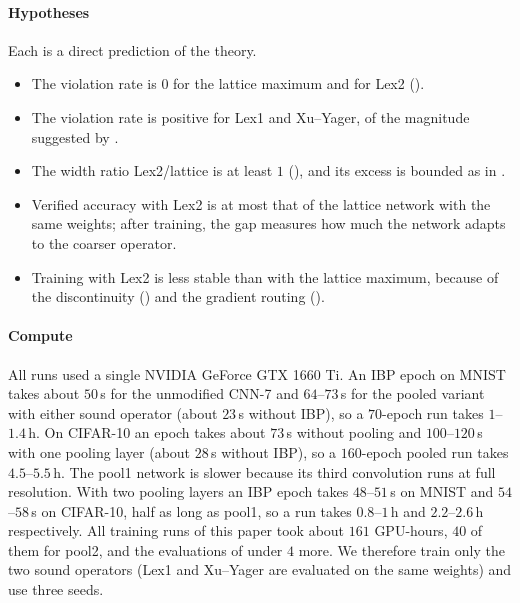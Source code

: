 \documentclass[preprint,12pt]{elsarticle}
\theoremstyle{definition}
\begin{document}
\paragraph{Hypotheses} Each is a direct prediction of the theory.
\begin{itemize}
\item[\textbf{H1}] The violation rate is $0$ for the lattice maximum and for Lex2 ().
\item[\textbf{H2}] The violation rate is positive for Lex1 and Xu--Yager, of the magnitude suggested by .
\item[\textbf{H3}] The width ratio Lex2/lattice is at least $1$ (), and its excess is bounded as in .
\item[\textbf{H4}] Verified accuracy with Lex2 is at most that of the lattice network with the same weights; after training, the gap measures how much the network adapts to the coarser operator.
\item[\textbf{H5}] Training with Lex2 is less stable than with the lattice maximum, because of the discontinuity () and the gradient routing ().
\end{itemize}

\paragraph{Compute} All runs used a single NVIDIA GeForce GTX 1660 Ti. An IBP epoch on MNIST takes about $50$\,s for the unmodified CNN-7 and $64$--$73$\,s for the pooled variant with either sound operator (about $23$\,s without IBP), so a $70$-epoch run takes $1$--$1.4$\,h. On CIFAR-10 an epoch takes about $73$\,s without pooling and $100$--$120$\,s with one pooling layer (about $28$\,s without IBP), so a $160$-epoch pooled run takes $4.5$--$5.5$\,h. The pool1 network is slower because its third convolution runs at full resolution. With two pooling layers an IBP epoch takes $48$--$51$\,s on MNIST and $54$--$58$\,s on CIFAR-10, half as long as pool1, so a run takes $0.8$--$1$\,h and $2.2$--$2.6$\,h respectively. All training runs of this paper took about $161$ GPU-hours, $40$ of them for pool2, and the evaluations of  under $4$ more. We therefore train only the two sound operators (Lex1 and Xu--Yager are evaluated on the same weights) and use three seeds.

\end{document}
